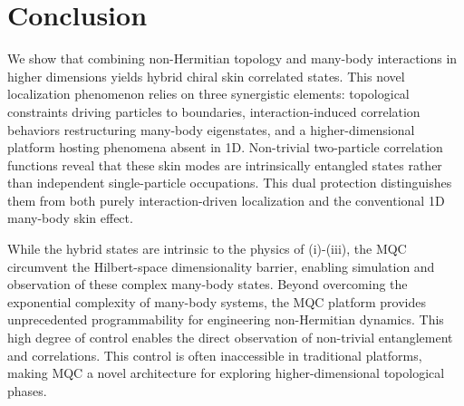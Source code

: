 \documentclass[longbibliography, aps, prx, amsmath, amssymb, amsfonts, twocolumn,superscriptaddress, footinbib]{revtex4-1}
\begin{document}
	\section{Conclusion}

	{
	We show that combining non-Hermitian topology and many-body interactions in higher dimensions yields hybrid chiral skin correlated states. This novel localization phenomenon relies on three synergistic elements: topological constraints driving particles to boundaries, interaction-induced correlation behaviors restructuring many-body eigenstates, and a higher-dimensional platform hosting phenomena absent in 1D. Non-trivial two-particle correlation functions reveal that these skin modes are intrinsically entangled states rather than independent single-particle occupations. This dual protection distinguishes them from both purely interaction-driven localization and the conventional 1D many-body skin effect.
	}

	{
	While the hybrid states are intrinsic to the physics of (i)-(iii), the MQC circumvent the Hilbert-space dimensionality barrier, enabling simulation and observation of these complex many-body states. 
	Beyond overcoming the exponential complexity of many-body systems, the MQC platform provides unprecedented programmability for engineering non-Hermitian dynamics. This high degree of control enables the direct observation of non-trivial entanglement and correlations. This control is often inaccessible in traditional platforms, making MQC a novel architecture for exploring higher-dimensional topological phases.
	}
\end{document}

